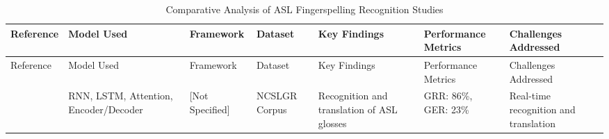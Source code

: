 \begin{longtable}{p{}p{}p{}p{}p{}p{}p{}} %
    \caption{Comparative Analysis of ASL Fingerspelling Recognition Studies}
    \label{table:asl-comparison}                                                                                                                                                                                                                                                                                                                                                                                                                                                                                                                                                                                                          \\
    \toprule
    Reference                                          & Model Used                                                                                                            & Framework                & Dataset                        & Key Findings                                                                                                                                              & Performance Metrics                                    & Challenges Addressed                                                                                                                                                    \\
    \midrule
    \endfirsthead
    \toprule
    Reference                                          & Model Used                                                                                                            & Framework                & Dataset                        & Key Findings                                                                                                                                              & Performance Metrics                                    & Challenges Addressed                                                                                                                                                    \\
    \midrule
    \endhead
    \bottomrule
    \endfoot
    \endlastfoot
    \cite{skumarTimeSeriesNeural2018}                  & RNN, LSTM, Attention, Encoder/Decoder                                                                                 & [Not Specified]          & NCSLGR Corpus                  & Recognition and translation of ASL glosses                                                                                                                & GRR: 86\%, GER: 23\%                                   & Real-time recognition and translation                                                                                                                                   \\


\end{longtable}
